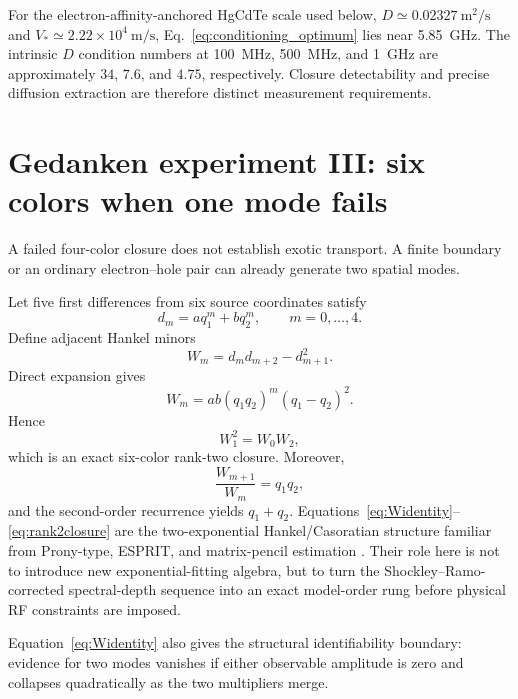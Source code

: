 \documentclass[11pt]{article}
\begin{document}
For the electron-affinity-anchored HgCdTe scale used below, $D\simeq0.02327~\mathrm{m^2/s}$ and $V_*\simeq2.22\times10^4~\mathrm{m/s}$, Eq.~\eqref{eq:conditioning_optimum} lies near \SI{5.85}{GHz}. The intrinsic $D$ condition numbers at \SI{100}{MHz}, \SI{500}{MHz}, and \SI{1}{GHz} are approximately $34$, $7.6$, and $4.75$, respectively. Closure detectability and precise diffusion extraction are therefore distinct measurement requirements.

\section{Gedanken experiment III: six colors when one mode fails}

A failed four-color closure does not establish exotic transport. A finite boundary or an ordinary electron--hole pair can already generate two spatial modes.

Let five first differences from six source coordinates satisfy
\begin{equation}
d_m=a q_1^m+b q_2^m,
\qquad m=0,\ldots,4.
\label{eq:twomode}
\end{equation}
Define adjacent Hankel minors
\begin{equation}
W_m=d_md_{m+2}-d_{m+1}^2.
\end{equation}
Direct expansion gives
\begin{equation}
\boxed{W_m=ab(q_1q_2)^m(q_1-q_2)^2.}
\label{eq:Widentity}
\end{equation}
Hence
\begin{equation}
\boxed{W_1^2=W_0W_2,}
\label{eq:rank2closure}
\end{equation}
which is an exact six-color rank-two closure. Moreover,
\begin{equation}
\frac{W_{m+1}}{W_m}=q_1q_2,
\end{equation}
and the second-order recurrence yields $q_1+q_2$. Equations~\eqref{eq:Widentity}--\eqref{eq:rank2closure} are the two-exponential Hankel/Casoratian structure familiar from Prony-type, ESPRIT, and matrix-pencil estimation \cite{Prony1795,RoyKailath1989,HuaSarkar1990}. Their role here is not to introduce new exponential-fitting algebra, but to turn the Shockley--Ramo-corrected spectral-depth sequence into an exact model-order rung before physical RF constraints are imposed.

Equation~\eqref{eq:Widentity} also gives the structural identifiability boundary: evidence for two modes vanishes if either observable amplitude is zero and collapses quadratically as the two multipliers merge.
\end{document}
